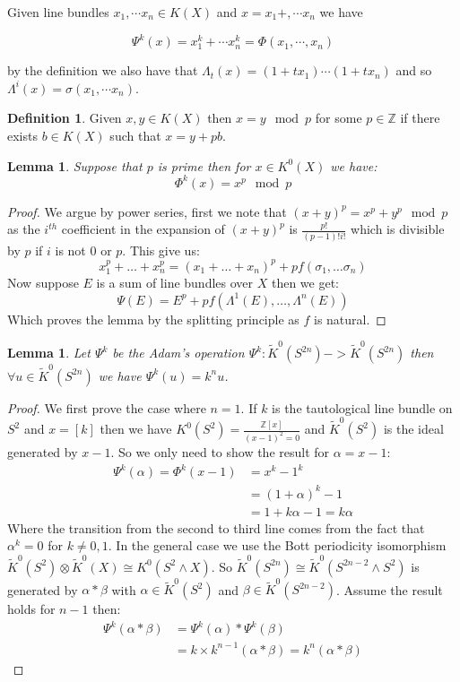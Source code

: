 \documentclass[a4paper,10pt]{article}
\theoremstyle{plain}%
\newtheorem{lem}[thm]{Lemma}
\theoremstyle{definition}
\newtheorem{defn}{Definition}
\theoremstyle{remark}
\newcommand{\ZZ}{\mathbb{Z}}
\newcommand{\KR}{\widetilde{K}}   %
\newcommand{\smsh}{\wedge}  %
\begin{document}
Given line bundles $x_1,\cdots x_n\in K(X)$ and $x=x_1+,\cdots x_n$ we have

$$\Psi^k(x)=x_1^k+\cdots x_n^k = \Phi(x_1,\cdots ,x_n)$$

by the definition we also have that $\Lambda_t(x)=(1+t x_1)\cdots (1+t x_n)$ and so
$\Lambda^i(x)=\sigma(x_1,\cdots x_n)$.

\begin{defn}
  Given $x,y\in K(X)$ then $x=y \mod p$ for some $p\in \ZZ$ if there exists
  $b\in K(X)$ such that $x=y+p b$.
\end{defn}

\begin{lem}
  Suppose that $p$ is prime then for $x\in K^0(X)$ we have:
$$\Phi^k(x)=x^p \mod p$$
\end{lem}

\begin{proof}
  We argue by power series, first we note that $(x+y)^p=x^p+y^p \mod p$ as the 
  $i^{th}$ coefficient in the expansion of $(x+y)^p$ is $\frac{p!}{(p-1)!i!}$ which is
  divisible by $p$ if $i$ is not 0 or $p$. This give us:
$$x_1^p + \ldots + x_n^p=(x_1+\ldots+x_n)^p + p f(\sigma_1,\ldots \sigma_n)$$
Now suppose $E$ is a sum of line bundles over $X$ then we get:
$$\Psi(E)=E^p+p f(\Lambda^1(E),\ldots,\Lambda^n(E))$$
Which proves the lemma by the splitting principle as $f$ is natural.
\end{proof}

\begin{lem}
Let $\Psi^k$ be the Adam's operation $\Psi^k:\KR^0(S^{2n})->\KR^0(S^{2n})$ then
$\forall u\in \KR^0(S^{2n})$ we have $\Psi^k(u)=k^nu$. 
\end{lem}

\begin{proof}
  We first prove the case where $n=1$. If $k$ is the tautological line
  bundle on $S^2$ and $x=[k]$ then we have $K^0(S^2)=\frac{\ZZ[x]}{(x-1)^2=0}$
  and $\KR^0(S^2)$ is the ideal generated by $x-1$. So we only need to show
  the result for $\alpha=x-1$:
\begin{align*}
  \Psi^k(\alpha)=\Phi^k(x-1)&=x^k-1^k\\
  &= (1+\alpha)^k - 1\\
  &= 1+k\alpha-1 = k\alpha
\end{align*}
Where the transition from the second to third line comes from the fact that
$\alpha^k=0$ for $k\neq 0,1$. In the general case we use the Bott periodicity isomorphism
$\KR^0(S^2)\otimes\KR^0(X)\cong K^0(S^2\smsh X)$. So
$\KR^0(S^{2n})\cong\KR^0(S^{2n-2}\smsh S^2)$ is generated by
$\alpha\ast\beta$ with $\alpha\in\KR^0(S^2)$ and $\beta\in\KR^0(S^{2n-2})$. Assume the result holds for $n-1$ then:
\begin{align*}
  \Psi^k(\alpha\ast\beta)&=\Psi^k(\alpha)\ast\Psi^k(\beta)\\
  &=k\times k^{n-1}(\alpha\ast\beta) = k^n(\alpha\ast\beta)
\end{align*}
\end{proof}
\end{document}
